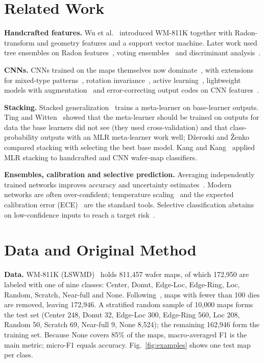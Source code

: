 \documentclass[conference]{IEEEtran}
\begin{document}
\section{Related Work}
\textbf{Handcrafted features.} Wu et al.~\cite{wu2015wafer} introduced WM-811K together with Radon-transform and geometry
features and a support vector machine. Later work used tree ensembles on Radon features~\cite{piao2018radon}, voting
ensembles~\cite{saqlain2019voting} and discriminant analysis~\cite{yu2016lnlda}.

\textbf{CNNs.} CNNs trained on the maps themselves now dominate~\cite{nakazawa2018wafer,yu2019cnn,saqlain2020cnn}, with
extensions for mixed-type patterns~\cite{kyeong2018mixed}, rotation invariance~\cite{kang2020rotation}, active
learning~\cite{shim2020active}, lightweight models with augmentation~\cite{tsai2020lightweight} and error-correcting
output codes on CNN features~\cite{jin2020ecoc}.

\textbf{Stacking.} Stacked generalization~\cite{wolpert1992stacked} trains a meta-learner on base-learner outputs. Ting
and Witten~\cite{ting1999issues} showed that the meta-learner should be trained on outputs for data the base learners did
not see (they used cross-validation) and that class-probability outputs with an MLR meta-learner work well; D\v{z}eroski
and \v{Z}enko~\cite{dzeroski2004stacking} compared stacking with selecting the best base model. Kang and
Kang~\cite{kang2021stacking} applied MLR stacking to handcrafted and CNN wafer-map classifiers.

\textbf{Ensembles, calibration and selective prediction.} Averaging independently trained networks improves accuracy and
uncertainty estimates~\cite{lakshminarayanan2017ensembles}. Modern networks are often over-confident; temperature
scaling~\cite{guo2017calibration} and the expected calibration error (ECE)~\cite{naeini2015ece} are the standard tools.
Selective classification abstains on low-confidence inputs to reach a target risk~\cite{geifman2017selective}.

\section{Data and Original Method}
\label{sec:method}
\textbf{Data.} WM-811K (LSWMD)~\cite{wu2015wafer,mirlab} holds 811,457 wafer maps, of which 172,950 are labeled with one
of nine classes: Center, Donut, Edge-Loc, Edge-Ring, Loc, Random, Scratch, Near-full and None. Following~\cite{kang2021stacking},
maps with fewer than 100 dies are removed, leaving 172,946. A stratified random sample of 10,000 maps forms the test set
(Center 248, Donut 32, Edge-Loc 300, Edge-Ring 560, Loc 208, Random 50, Scratch 69, Near-full 9, None 8,524); the
remaining 162,946 form the training set. Because None covers 85\% of the maps, macro-averaged F1 is the main metric;
micro-F1 equals accuracy. Fig.~\ref{fig:examples} shows one test map per class.
\end{document}
